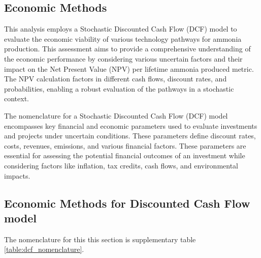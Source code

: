 \documentclass{article}
\begin{document}
\subsection{Economic Methods}

This analysis employs a Stochastic Discounted Cash Flow (DCF) model to evaluate the economic viability of various technology pathways for ammonia production. This assessment aims to provide a comprehensive understanding of the economic performance by considering various uncertain factors and their impact on the Net Present Value (NPV) per lifetime ammonia produced metric. The NPV calculation factors in different cash flows, discount rates, and probabilities, enabling a robust evaluation of the pathways in a stochastic context.

The nomenclature for a Stochastic Discounted Cash Flow (DCF) model encompasses key financial and economic parameters used to evaluate investments and projects under uncertain conditions. These parameters define discount rates, costs, revenues, emissions, and various financial factors. These parameters are essential for assessing the potential financial outcomes of an investment while considering factors like inflation, tax credits, cash flows, and environmental impacts.

\subsection{Economic Methods for Discounted Cash Flow model}

The nomenclature for this this section is supplementary table \ref{table:dcf_nomenclature}.
\end{document}
